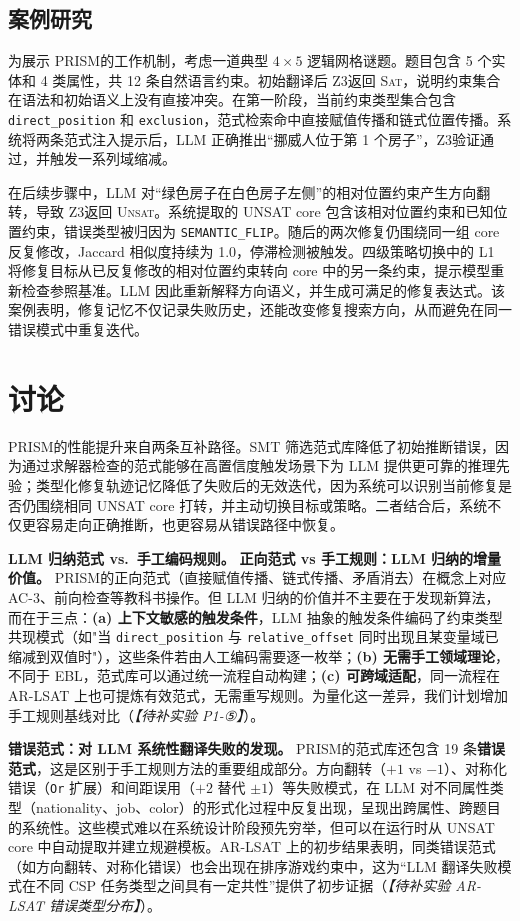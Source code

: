 \documentclass[UTF8,a4paper,12pt]{ctexart}
\newcommand{\PRISM}{PRISM}
\newcommand{\sat}{\textsc{Sat}}
\newcommand{\unsat}{\textsc{Unsat}}
\newcommand{\zthree}{Z3}
\begin{document}
\subsection{案例研究}

为展示 \PRISM 的工作机制，考虑一道典型 \(4\times5\) 逻辑网格谜题。题目包含 5 个实体和 4 类属性，共 12 条自然语言约束。初始翻译后 \zthree 返回 \sat，说明约束集合在语法和初始语义上没有直接冲突。在第一阶段，当前约束类型集合包含 \texttt{direct\_position} 和 \texttt{exclusion}，范式检索命中直接赋值传播和链式位置传播。系统将两条范式注入提示后，LLM 正确推出“挪威人位于第 1 个房子”，\zthree 验证通过，并触发一系列域缩减。

在后续步骤中，LLM 对“绿色房子在白色房子左侧”的相对位置约束产生方向翻转，导致 \zthree 返回 \unsat。系统提取的 UNSAT core 包含该相对位置约束和已知位置约束，错误类型被归因为 \texttt{SEMANTIC\_FLIP}。随后的两次修复仍围绕同一组 core 反复修改，Jaccard 相似度持续为 1.0，停滞检测被触发。四级策略切换中的 L1 将修复目标从已反复修改的相对位置约束转向 core 中的另一条约束，提示模型重新检查参照基准。LLM 因此重新解释方向语义，并生成可满足的修复表达式。该案例表明，修复记忆不仅记录失败历史，还能改变修复搜索方向，从而避免在同一错误模式中重复迭代。

\section{讨论}

\PRISM 的性能提升来自两条互补路径。SMT 筛选范式库降低了初始推断错误，因为通过求解器检查的范式能够在高置信度触发场景下为 LLM 提供更可靠的推理先验；类型化修复轨迹记忆降低了失败后的无效迭代，因为系统可以识别当前修复是否仍围绕相同 UNSAT core 打转，并主动切换目标或策略。二者结合后，系统不仅更容易走向正确推断，也更容易从错误路径中恢复。

\textbf{LLM 归纳范式 vs.\ 手工编码规则。}
\textbf{正向范式 vs 手工规则：LLM 归纳的增量价值。}
\PRISM 的正向范式（直接赋值传播、链式传播、矛盾消去）在概念上对应 AC-3、前向检查等教科书操作。但 LLM 归纳的价值并不主要在于发现新算法，而在于三点：\textbf{(a) 上下文敏感的触发条件}，LLM 抽象的触发条件编码了约束类型共现模式（如"当 \texttt{direct\_position} 与 \texttt{relative\_offset} 同时出现且某变量域已缩减到双值时"），这些条件若由人工编码需要逐一枚举；\textbf{(b) 无需手工领域理论}，不同于 EBL，范式库可以通过统一流程自动构建；\textbf{(c) 可跨域适配}，同一流程在 AR-LSAT 上也可提炼有效范式，无需重写规则。为量化这一差异，我们计划增加手工规则基线对比（\textit{【待补实验 P1-⑤】}）。

\textbf{错误范式：对 LLM 系统性翻译失败的发现。}
\PRISM 的范式库还包含 19 条\textbf{错误范式}，这是区别于手工规则方法的重要组成部分。方向翻转（\(+1\) vs \(-1\)）、对称化错误（\texttt{Or} 扩展）和间距误用（\(+2\) 替代 \(\pm1\)）等失败模式，在 LLM 对不同属性类型（nationality、job、color）的形式化过程中反复出现，呈现出跨属性、跨题目的系统性。这些模式难以在系统设计阶段预先穷举，但可以在运行时从 UNSAT core 中自动提取并建立规避模板。AR-LSAT 上的初步结果表明，同类错误范式（如方向翻转、对称化错误）也会出现在排序游戏约束中，这为“LLM 翻译失败模式在不同 CSP 任务类型之间具有一定共性”提供了初步证据（\textit{【待补实验 AR-LSAT 错误类型分布】}）。
\end{document}
